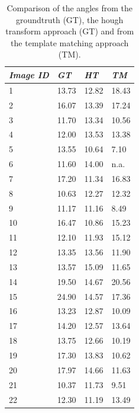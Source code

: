 \documentclass[10pt,twocolumn,letterpaper]{article}
\begin{document}
\begin{table}
\begin{center}
\begin{tabular}{| l | l | l | l |}
  \hline
  \emph{Image ID} & \emph{GT} & \emph{HT} & \emph{TM} \\ \hline
  1 & 13.73 & 12.82 & 18.43 \\ \hline
  2 & 16.07 & 13.39 & 17.24 \\ \hline
  3 & 11.70 & 13.34 & 10.56 \\ \hline
  4 & 12.00 & 13.53 & 13.38 \\ \hline
  5 & 13.55 & 10.64 & 7.10 \\ \hline
  6 & 11.60 & 14.00 & n.a. \\ \hline
  7 & 17.20 & 11.34 & 16.83 \\ \hline
  8 & 10.63 & 12.27 & 12.32 \\ \hline
  9 & 11.17 & 11.16 & 8.49 \\ \hline
  10 & 16.47 & 10.86 & 15.23 \\ \hline
  11 & 12.10 & 11.93 & 15.12 \\ \hline
  12 & 13.35 & 13.56 & 11.90 \\ \hline
  13 & 13.57 & 15.09 & 11.65 \\ \hline
  14 & 19.50 & 14.67 & 20.56 \\ \hline
  15 & 24.90 & 14.57 & 17.36 \\ \hline
  16 & 13.23 & 12.87 & 10.09 \\ \hline
  17 & 14.20 & 12.57 & 13.64 \\ \hline
  18 & 13.75 & 12.66 & 10.19 \\ \hline
  19 & 17.30 & 13.83 & 10.62 \\ \hline
  20 & 17.97 & 14.66 & 11.63 \\ \hline
  21 & 10.37 & 11.73 & 9.51 \\ \hline
  22 & 12.30 & 11.19 & 13.49 \\ \hline
\end{tabular}
\caption{Comparison of the angles from the groundtruth (GT), the hough transform approach (GT) and from the template matching approach (TM).}
\label{tab:results}
\end{center}
\end{table}
\end{document}
